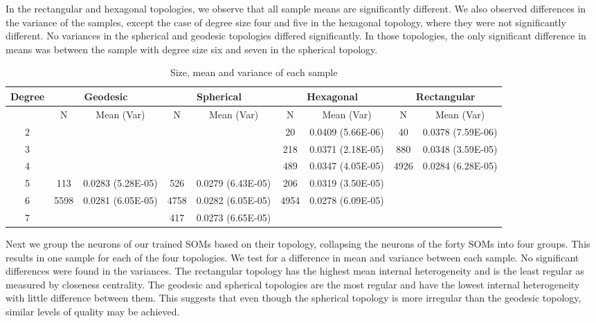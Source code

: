 In the rectangular and hexagonal topologies, we observe that all sample means
are significantly different.  We also observed differences in the variance of
the samples, except the case of degree size four and five in the hexagonal
topology, where they were not significantly different. No variances in the
spherical and geodesic topologies differed significantly.  In those topologies,
the only significant difference in means was between the sample with degree size
six and seven in the spherical topology.


\begin{table}[htb]
\centering
\scriptsize
\begin{minipage}{\textwidth}
\caption{Size, mean and variance of each sample}
\label{meanvar1}
\begin{tabular}{|c||cc|cc|cc|cc|}
\hline
\textbf{Degree} & \multicolumn{2}{c|}{\textbf{Geodesic}} &
\multicolumn{2}{c|}{\textbf{Spherical}} &
\multicolumn{2}{c|}{\textbf{Hexagonal}} &
\multicolumn{2}{c|}{\textbf{Rectangular}} \\
\hline
& N & Mean (Var) & N & Mean (Var) & N & Mean (Var) & N & Mean (Var) \\
\hline
2&&&&& 20& 0.0409 (5.66E-06)& 40& 0.0378 (7.59E-06)\\ 
3&&&&& 218& 0.0371 (2.18E-05)& 880& 0.0348 (3.59E-05)\\ 
4&&&&& 489& 0.0347 (4.05E-05)& 4926& 0.0284 (6.28E-05)\\ 
5& 113& 0.0283 (5.28E-05)& 526& 0.0279 (6.43E-05)& 206& 0.0319 (3.50E-05)&&\\ 
6& 5598& 0.0281 (6.05E-05)& 4758& 0.0282 (6.05E-05)& 4954& 0.0278
(6.09E-05)&&\\ 
7&&& 417& 0.0273 (6.65E-05)&&&&\\ 
\hline
\end{tabular} \end{minipage} \end{table}


Next we group the neurons of our trained SOMs based on their topology,
collapsing the neurons of the forty SOMs into four groups.  This results in one
sample for each of the four topologies.  We test for a difference in mean and
variance between each sample. No significant differences were found in the
variances.  The rectangular topology has the highest mean internal heterogeneity
and is the least regular as measured by closeness centrality. The geodesic and
spherical topologies are the most regular and have the lowest internal
heterogeneity with little difference between them.  This suggests that even
though the spherical topology is more irregular than the geodesic topology,
similar levels of quality may be achieved. 


